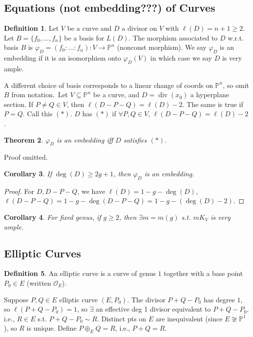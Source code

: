 \documentclass{article}
\theoremstyle{definition}
\newtheorem{defn}{Definition}[section]
\theoremstyle{remark}
\theoremstyle{plain}
\newtheorem{thm}[defn]{Theorem}
\newtheorem{crly}[defn]{Corollary}
\newcommand{\PP}{\mathbb{P}}
\newcommand{\divi}{\operatorname{div}}
\begin{document}
\subsection{Equations (not embedding???) of Curves}
\begin{defn}
    Let $V$ be a curve and $D$ a divisor on $V$ with $\ell(D)=n+1\ge 2$. Let $B=\{f_0,...,f_n\}$ be a basis for $L(D)$. The morphism associated to $D$ w.r.t. basis $B$ is $\varphi_D=(f_0:\ldots:f_n):V\to\PP^n$ (nonconst morphism). We say $\varphi_D$ is an embedding if it is an isomorphism onto $\varphi_D(V)$ in which case we say $D$ is very ample.
\end{defn}
A different choice of basis corresponds to a linear change of coords on $\PP^n$, so omit $B$ from notation.\
Let $V\subseteq\PP^n$ be a curve, and $D=\divi(x_0)$ a hyperplane section. If $P\neq Q\in V$, then $\ell(D-P-Q)=\ell(D)-2$. The same is true if $P=Q$. Call this $(\ast)$. $D$ has $(\ast)$ if $\forall P,Q\in V$, $\ell(D-P-Q)=\ell(D)-2$.
\begin{thm}
    $\varphi_D$ is an embedding iff $D$ satisfies $(\ast)$.
\end{thm}
Proof omitted.
\begin{crly}
    If $\deg (D)\ge 2g+1$, then $\varphi_D$ is an embedding.
\end{crly}
\begin{proof}
    For $D, D-P-Q$, we have $\ell(D)=1-g-\deg(D)$, $\ell(D-P-Q)=1-g-\deg(D-P-Q)=1-g-(\deg(D)-2)$.
\end{proof}
\begin{crly}
    For fixed genus, if $g\ge 2$, then $\exists m=m(g)$ s.t. $mK_V$ is very ample.
\end{crly}
\subsection{Elliptic Curves}
\begin{defn}
    An elliptic curve is a curve of genus $1$ together with a base point $P_0\in E$ (written $\mathcal O_E$).
\end{defn}
Suppose $P,Q\in E$ elliptic curve $(E,P_0)$. The divisor $P+Q-P_0$ has degree $1$, so $\ell(P+Q-P_0)=1$, so $\exists$ an effective deg 1 divisor equivalent to $P+Q-P_0$, i.e., $R\in E$ s.t. $P+Q-P_0\sim R$. Distinct pts on $E$ are inequivalent (since $E\not\cong\PP^1$), so $R$ is unique. Define $P\oplus_E Q=R$, i.e., $P+Q=R$. 
\end{document}
